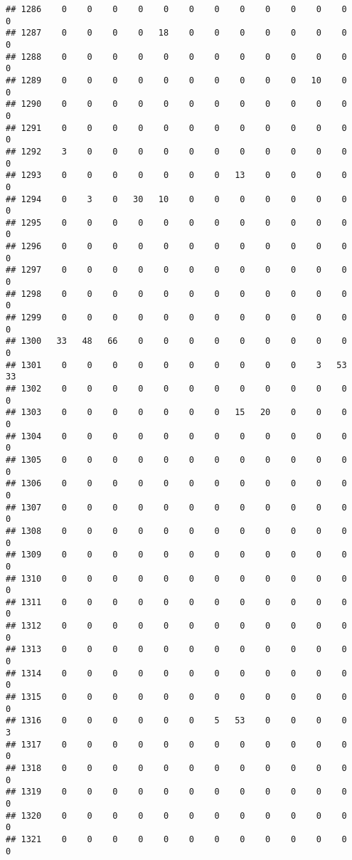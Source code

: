 \documentclass[]{article}
\begin{document}
\begin{verbatim}
## 1286    0    0    0    0    0    0    0    0    0    0    0    0    0
## 1287    0    0    0    0   18    0    0    0    0    0    0    0    0
## 1288    0    0    0    0    0    0    0    0    0    0    0    0    0
## 1289    0    0    0    0    0    0    0    0    0    0   10    0    0
## 1290    0    0    0    0    0    0    0    0    0    0    0    0    0
## 1291    0    0    0    0    0    0    0    0    0    0    0    0    0
## 1292    3    0    0    0    0    0    0    0    0    0    0    0    0
## 1293    0    0    0    0    0    0    0   13    0    0    0    0    0
## 1294    0    3    0   30   10    0    0    0    0    0    0    0    0
## 1295    0    0    0    0    0    0    0    0    0    0    0    0    0
## 1296    0    0    0    0    0    0    0    0    0    0    0    0    0
## 1297    0    0    0    0    0    0    0    0    0    0    0    0    0
## 1298    0    0    0    0    0    0    0    0    0    0    0    0    0
## 1299    0    0    0    0    0    0    0    0    0    0    0    0    0
## 1300   33   48   66    0    0    0    0    0    0    0    0    0    0
## 1301    0    0    0    0    0    0    0    0    0    0    3   53   33
## 1302    0    0    0    0    0    0    0    0    0    0    0    0    0
## 1303    0    0    0    0    0    0    0   15   20    0    0    0    0
## 1304    0    0    0    0    0    0    0    0    0    0    0    0    0
## 1305    0    0    0    0    0    0    0    0    0    0    0    0    0
## 1306    0    0    0    0    0    0    0    0    0    0    0    0    0
## 1307    0    0    0    0    0    0    0    0    0    0    0    0    0
## 1308    0    0    0    0    0    0    0    0    0    0    0    0    0
## 1309    0    0    0    0    0    0    0    0    0    0    0    0    0
## 1310    0    0    0    0    0    0    0    0    0    0    0    0    0
## 1311    0    0    0    0    0    0    0    0    0    0    0    0    0
## 1312    0    0    0    0    0    0    0    0    0    0    0    0    0
## 1313    0    0    0    0    0    0    0    0    0    0    0    0    0
## 1314    0    0    0    0    0    0    0    0    0    0    0    0    0
## 1315    0    0    0    0    0    0    0    0    0    0    0    0    0
## 1316    0    0    0    0    0    0    5   53    0    0    0    0    3
## 1317    0    0    0    0    0    0    0    0    0    0    0    0    0
## 1318    0    0    0    0    0    0    0    0    0    0    0    0    0
## 1319    0    0    0    0    0    0    0    0    0    0    0    0    0
## 1320    0    0    0    0    0    0    0    0    0    0    0    0    0
## 1321    0    0    0    0    0    0    0    0    0    0    0    0    0

\end{verbatim}
\end{document}
